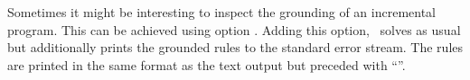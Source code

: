 Sometimes it might be interesting to inspect the grounding of an incremental program.
This can be achieved using option .
Adding this option, \clingo\ solves as usual
but additionally prints the grounded rules to the standard error stream.
The rules are printed in the same format as the text output but preceded with ``\code{\%}''.

